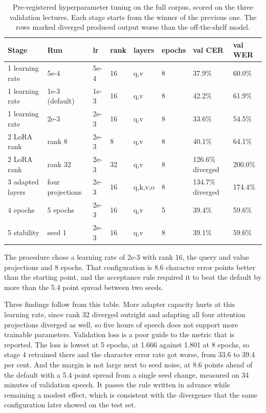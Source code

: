 \begin{table}[htbp]
\centering
\caption[Pre-registered hyperparameter tuning on the full corpus]{Pre-registered hyperparameter tuning on the full corpus, scored on the three
validation lectures. Each stage starts from the winner of the previous one. The rows
marked diverged produced output worse than the off-the-shelf model.}
\label{tab:tuning}
\small
\begin{tabular}{p{2.8cm}p{2.6cm}p{1.1cm}p{1.0cm}p{1.4cm}p{1.1cm}p{1.2cm}p{1.2cm}}
\toprule
Stage & Run & lr & rank & layers & epochs & val CER & val WER \\
\midrule
1 learning rate & 5e-4 & 5e-4 & 16 & q,v & 8 & 37.9\% & 60.0\% \\
1 learning rate & 1e-3 (default) & 1e-3 & 16 & q,v & 8 & 42.2\% & 61.9\% \\
1 learning rate & 2e-3 & 2e-3 & 16 & q,v & 8 & 33.6\% & 54.5\% \\
2 LoRA rank & rank 8 & 2e-3 & 8 & q,v & 8 & 40.1\% & 64.1\% \\
2 LoRA rank & rank 32 & 2e-3 & 32 & q,v & 8 & 126.6\% diverged & 200.0\% \\
3 adapted layers & four projections & 2e-3 & 16 & q,k,v,o & 8 & 134.7\% diverged &
174.4\% \\
4 epochs & 5 epochs & 2e-3 & 16 & q,v & 5 & 39.4\% & 59.6\% \\
5 stability & seed 1 & 2e-3 & 16 & q,v & 8 & 39.1\% & 59.6\% \\
\bottomrule
\end{tabular}
\end{table}

The procedure chose a learning rate of 2e-3 with rank 16, the query and value projections
and 8 epochs. That configuration is 8.6 character error points better than the starting
point, and the acceptance rule required it to beat the default by more than the 5.4 point
spread between two seeds.

Three findings follow from this table. More adapter capacity hurts at this learning rate,
since rank 32 diverged outright and adapting all four attention projections diverged as
well, so five hours of speech does not support more trainable parameters. Validation loss
is a poor guide to the metric that is reported. The loss is lowest at 5 epochs, at 1.666
against 1.801 at 8 epochs, so stage 4 retrained there and the character error rate got
worse, from 33.6 to 39.4 per cent. And the margin is not large next to seed noise, at 8.6
points ahead of the default with a 5.4 point spread from a single seed change, measured on
34 minutes of validation speech. It passes the rule written in advance while remaining a
modest effect, which is consistent with the divergence that the same configuration later
showed on the test set.

